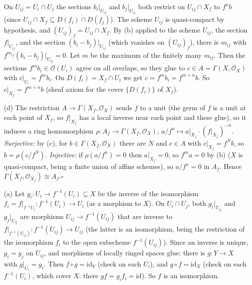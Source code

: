 \documentclass[11pt]{article}
\begin{document}
On $U_{ij}=U_i\cap U_j$ the sections $b_i|_{U_{ij}}$ and $b_j|_{U_{ij}}$ both restrict on $U_{ij}\cap X_f$ to $f^nb$ (since $U_{ij}\cap X_f\subseteq D(f_i)\cap D(f_j)$). The scheme $U_{ij}$ is quasi-compact by hypothesis, and $(U_{ij})_f=U_{ij}\cap X_f$. By (b) applied to the scheme $U_{ij}$, the section $f|_{U_{ij}}$, and the section $(b_i-b_j)|_{U_{ij}}$ (which vanishes on $(U_{ij})_f$), there is $m_{ij}$ with $f^{m_{ij}}(b_i-b_j)|_{U_{ij}}=0$. Let $m$ be the maximum of the finitely many $m_{ij}$. Then the sections $f^mb_i\in\mathcal O(U_i)$ agree on all overlaps, so they glue to $c\in A=\Gamma(X,\mathcal O_X)$ with $c|_{U_i}=f^mb_i$. On $D(f_i)=X_f\cap U_i$ we get $c=f^mb_i=f^{m+n}b$. So $c|_{X_f}=f^{m+n}b$ (sheaf axiom for the cover $\{D(f_i)\}$ of $X_f$).

(d) The restriction $A\to\Gamma(X_f,\mathcal O_X)$ sends $f$ to a unit (the germ of $f$ is a unit at each point of $X_f$, so $f|_{X_f}$ has a local inverse near each point and these glue), so it induces a ring homomorphism $\rho:A_f\to\Gamma(X_f,\mathcal O_X)$, $a/f^n\mapsto a|_{X_f}\cdot(f|_{X_f})^{-n}$. \emph{Surjective:} by (c), for $b\in\Gamma(X_f,\mathcal O_X)$ there are $N$ and $c\in A$ with $c|_{X_f}=f^Nb$, so $b=\rho(c/f^N)$. \emph{Injective:} if $\rho(a/f^n)=0$ then $a|_{X_f}=0$, so $f^ma=0$ by (b) ($X$ is quasi-compact, being a finite union of affine schemes), so $a/f^n=0$ in $A_f$. Hence $\Gamma(X_f,\mathcal O_{X_f})\cong A_f$.\hfill$\square$

\pf
(a) Let $g_i:U_i\to f^{-1}(U_i)\subseteq X$ be the inverse of the isomorphism $f_i=f|_{f^{-1}U_i}:f^{-1}(U_i)\to U_i$ (as a morphism to $X$). On $U_i\cap U_j$, both $g_i|_{U_{ij}}$ and $g_j|_{U_{ij}}$ are morphisms $U_{ij}\to f^{-1}(U_{ij})$ that are inverse to $f|_{f^{-1}(U_{ij})}:f^{-1}(U_{ij})\to U_{ij}$ (the latter is an isomorphism, being the restriction of the isomorphism $f_i$ to the open subscheme $f^{-1}(U_{ij})$). Since an inverse is unique, $g_i=g_j$ on $U_{ij}$, and morphisms of locally ringed spaces glue: there is $g:Y\to X$ with $g|_{U_i}=g_i$. Then $f\circ g=\mathrm{id}_Y$ (check on each $U_i$), and $g\circ f=\mathrm{id}_X$ (check on each $f^{-1}(U_i)$, which cover $X$: there $g f=g_i f_i=\mathrm{id}$). So $f$ is an isomorphism.
\end{document}
